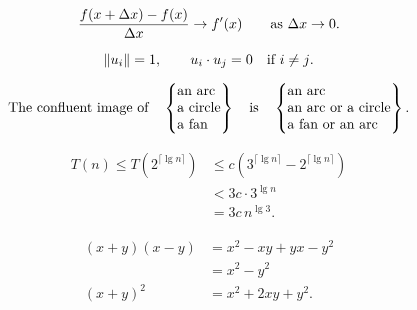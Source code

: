 \documentclass[12pt, a4paper, oneside]{article}
\newcommand{\mathup}[1]{\mathrm{#1}}
\theoremstyle{Plain}
\theoremstyle{Definition}
\theoremstyle{Remark}
\begin{document}
\begin{appendix}
$$\frac{f(x+\mathup{\Delta} x)-f(x)}{\mathup{\Delta} x}\to f'(x)
\qquad \hbox{as $\mathup{\Delta} x\to0$.}$$

$$\|u_i\|=1,\qquad u_i\cdot u_j=0\quad\hbox{if $i\ne j$.}$$


$$\hbox{The confluent image of}\quad
\begin{Bmatrix}\hbox{an arc}\hfill\\\hbox{a circle}\hfill\\
\hbox{a fan}\hfill\\\end{Bmatrix}
\quad\hbox{is}\quad
\begin{Bmatrix}\hbox{an arc}\hfill\\
\hbox{an arc or a circle}\hfill\\
\hbox{a fan or an arc}\hfill\end{Bmatrix}.$$


\begin{align*}
T(n)\le T(2^{\lceil\lg n\rceil})
&\le c(3^{\lceil\lg n\rceil}-2^{\lceil\lg n\rceil})\\
&<3c\cdot3^{\lg n}\\
&=3c\,n^{\lg3}.
\end{align*}



\begin{align*}
\begin{aligned}
(x+y)(x-y)&=x^2-xy+yx-y^2\\
&=x^2-y^2\\
(x+y)^2&=x^2+2xy+y^2.
\end{aligned}
\end{align*}


\end{appendix}
\end{document}
